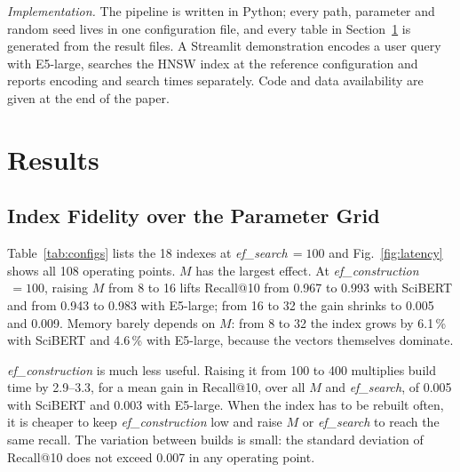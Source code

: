\documentclass[conference, letterpaper]{IEEEtran}
\newcommand{\efc}{\textit{ef\_construction}}
\newcommand{\efs}{\textit{ef\_search}}
\begin{document}
\textit{Implementation.} The pipeline is written in Python; every path, parameter and random seed lives in one configuration file, and every table in Section~\ref{sec:results} is generated from the result files. A Streamlit demonstration encodes a user query with E5-large, searches the HNSW index at the reference configuration and reports encoding and search times separately. Code and data availability are given at the end of the paper.

\section{Results}
\label{sec:results}

\subsection{Index Fidelity over the Parameter Grid}

Table~\ref{tab:configs} lists the 18 indexes at \efs{}$\,=100$ and Fig.~\ref{fig:latency} shows all 108 operating points. $M$ has the largest effect. At \efc{}$\,=100$, raising $M$ from 8 to 16 lifts Recall@10 from 0.967 to 0.993 with SciBERT and from 0.943 to 0.983 with E5-large; from 16 to 32 the gain shrinks to 0.005 and 0.009. Memory barely depends on $M$: from 8 to 32 the index grows by 6.1\,\% with SciBERT and 4.6\,\% with E5-large, because the vectors themselves dominate.

\efc{} is much less useful. Raising it from 100 to 400 multiplies build time by 2.9--3.3, for a mean gain in Recall@10, over all $M$ and \efs{}, of 0.005 with SciBERT and 0.003 with E5-large. When the index has to be rebuilt often, it is cheaper to keep \efc{} low and raise $M$ or \efs{} to reach the same recall. The variation between builds is small: the standard deviation of Recall@10 does not exceed 0.007 in any operating point.
\end{document}
